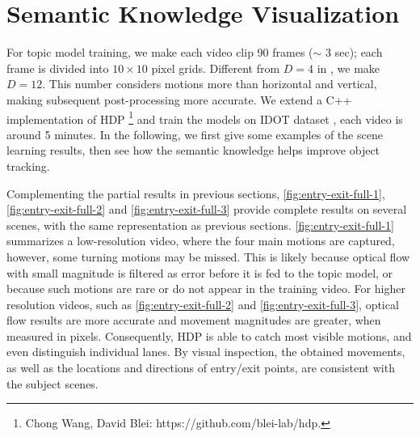 \section{Semantic Knowledge Visualization}

For topic model training, we make each video clip 90 frames ($\sim$ 3 sec); each frame is divided into $10\times10$ pixel grids. Different from $D=4$ in \cite{wang2009unsupervised,kuettel2010s}, we make $D=12$. This number considers motions more than horizontal and vertical, making subsequent post-processing more accurate. 
We extend a C++ implementation of HDP \footnote{Chong Wang, David Blei: https://github.com/blei-lab/hdp.} and train the models on IDOT dataset \cite{yanziVehicleTracker}, each video is around 5 minutes. 
In the following, we first give some examples of the scene learning results, then see how the semantic knowledge helps improve object tracking.

Complementing the partial results in previous sections, \ref{fig:entry-exit-full-1}, \ref{fig:entry-exit-full-2} and \ref{fig:entry-exit-full-3} provide complete results on several scenes, 
with the same representation as previous sections.
\ref{fig:entry-exit-full-1} summarizes a low-resolution video, where the four main motions are captured, however, some turning motions may be missed. This is likely because optical flow with small magnitude is filtered as error before it is fed to the topic model, or because such motions are rare or do not appear in the training video.
For higher resolution videos, such as \ref{fig:entry-exit-full-2} and \ref{fig:entry-exit-full-3}, optical flow results are more accurate and movement magnitudes are greater, when measured in pixels. Consequently, HDP is able to catch most visible motions, and even distinguish individual lanes.
By visual inspection, the obtained movements, as well as the locations and directions of entry/exit points, are consistent with the subject scenes. 

